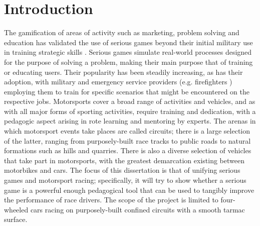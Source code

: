 \chapter{Introduction}

The gamification of areas of activity such as marketing, problem solving and education \cite{michael2005serious} has validated the use of serious games beyond their initial military use in training strategic skills \cite{djaouti2011classifying}.  Serious games simulate real-world processes designed for the purpose of solving a problem, making their main purpose that of training or educating users. Their popularity has been steadily increasing, as has their adoption, with military \cite{djaouti2011classifying} and emergency service providers (e.g. firefighters \cite{michael2005serious}) employing them to train for specific scenarios that might be encountered on the respective jobs. Motorsports cover a broad range of activities and vehicles, and as with all major forms of sporting activities, require training and dedication, with a pedagogic aspect arising in rote learning and mentoring by experts. The arenas in which motorsport events take places are called circuits; there is a large selection of the latter, ranging from purposely-built race tracks to public roads to natural formations such as hills and quarries. There is also a diverse selection of vehicles that take part in motorsports, with the greatest demarcation existing between motorbikes and cars. The focus of this dissertation is that of unifying serious games and motorsport racing; specifically, it will try to show whether a serious game is a powerful enough pedagogical tool that can be used to tangibly improve the performance of race drivers. The scope of the project is limited to four-wheeled cars racing on purposely-built confined circuits with a smooth tarmac surface.  


